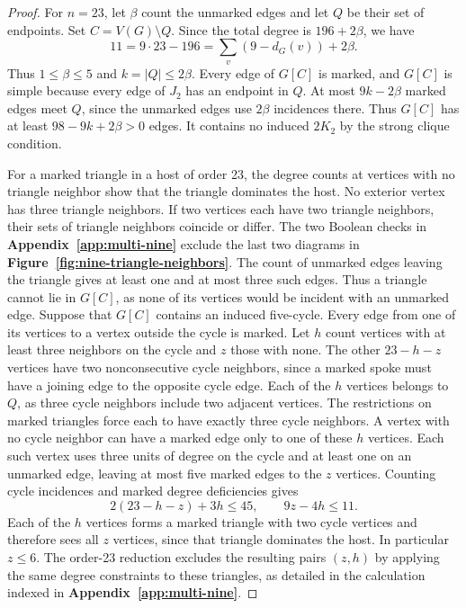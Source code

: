 \documentclass[preprint,11pt,numbers]{elsarticle-arxiv}
\numberwithin{equation}{section}
\theoremstyle{definition}
\begin{document}
\begin{proof}
For $n=23$, let $\beta$ count the unmarked edges and let $Q$
be their set of endpoints. Set $C=V(G)\setminus Q$. Since
the total degree is $196+2\beta$, we have
\[
 11=9\cdot23-196=\sum_v(9-d_G(v))+2\beta.
\]
Thus $1\le\beta\le5$ and $k=|Q|\le2\beta$. Every edge
of $G[C]$ is marked, and $G[C]$ is simple because every edge
of $J_2$ has an endpoint in $Q$. At most $9k-2\beta$ marked
edges meet $Q$, since the unmarked edges use $2\beta$ incidences
there. Thus $G[C]$ has at least $98-9k+2\beta>0$ edges.
It contains no induced $2K_2$ by the strong clique condition.

For a marked triangle in a host of order 23, the degree counts at
vertices with no triangle neighbor show that the triangle dominates
the host. No exterior vertex has three triangle neighbors. If two
vertices each have two triangle neighbors, their sets of triangle
neighbors coincide or differ. The two Boolean checks
in \textbf{Appendix~\ref{app:multi-nine}} exclude the last two diagrams
in \textbf{Figure~\ref{fig:nine-triangle-neighbors}}.
The count of unmarked edges leaving the triangle gives at least one
and at most three such edges. Thus a triangle cannot lie in $G[C]$,
as none of its vertices would be incident with an unmarked edge.
Suppose that $G[C]$ contains an induced five-cycle. Every edge from
one of its vertices to a vertex outside the cycle is marked. Let $h$
count vertices with at least three neighbors on the cycle and $z$
those with none. The other $23-h-z$ vertices have two nonconsecutive
cycle neighbors, since a marked spoke must have a joining edge to
the opposite cycle edge. Each of the $h$ vertices belongs to $Q$,
as three cycle neighbors include two adjacent vertices. The
restrictions on marked triangles force each to have exactly three
cycle neighbors. A vertex with no cycle neighbor can have a marked
edge only to one of these $h$ vertices. Each such vertex uses three
units of degree on the cycle and at least one on an unmarked edge,
leaving at most five marked edges to the $z$ vertices. Counting
cycle incidences and marked degree deficiencies gives
\[
  2(23-h-z)+3h\leq45,\qquad 9z-4h\leq11 .
\]
Each of the $h$ vertices forms a marked triangle with two cycle
vertices and therefore sees all $z$ vertices, since that triangle
dominates the host. In particular $z\leq6$. The order-23 reduction
excludes the resulting pairs $(z,h)$ by applying the same degree
constraints to these triangles, as detailed in the calculation
indexed in \textbf{Appendix~\ref{app:multi-nine}}.


\end{proof}
\end{document}
